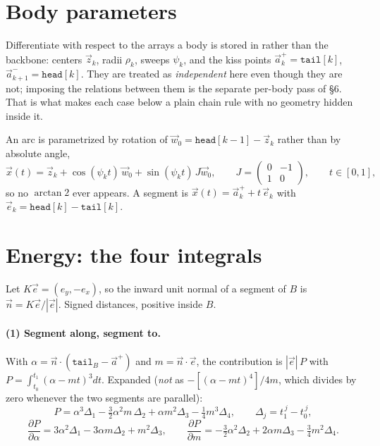 \documentclass[11pt]{article}
\newcommand{\vv}[1]{\vec{#1}}
\newcommand{\code}[1]{\texttt{#1}}
\begin{document}
\section{Body parameters}

Differentiate with respect to the arrays a body is stored in rather than the backbone: centers
$\vv z_k$, radii $\rho_k$, sweeps $\psi_k$, and the kiss points $\vv a^+_k=\code{tail}[k]$,
$\vv a^-_{k+1}=\code{head}[k]$. They are treated as \emph{independent} here even though they are not;
imposing the relations between them is the separate per-body pass of \S6. That is what makes each
case below a plain chain rule with no geometry hidden inside it.

An arc is parametrized by rotation of $\vv w_0=\code{head}[k-1]-\vv z_k$ rather than by absolute
angle,
\begin{equation}
  \vv x(t)=\vv z_k+\cos(\psi_k t)\,\vv w_0+\sin(\psi_k t)\,J\vv w_0,
  \qquad J=\begin{pmatrix}0&-1\\1&0\end{pmatrix},\qquad t\in[0,1],
\end{equation}
so no $\arctan\!2$ ever appears. A segment is $\vv x(t)=\vv a^+_k+t\,\vv e_k$ with
$\vv e_k=\code{head}[k]-\code{tail}[k]$.

\section{Energy: the four integrals}

Let $K\vv e=(e_y,-e_x)$, so the inward unit normal of a segment of $B$ is $\vv n=K\vv e/|\vv e|$.
Signed distances, positive inside $B$.

\paragraph{(1) Segment along, segment to.} With $\alpha=\vv n\cdot(\code{tail}_B-\vv a^+)$ and
$m=\vv n\cdot\vv e$, the contribution is $|\vv e|\,P$ with
$P=\int_{t_0}^{t_1}(\alpha-mt)^3dt$. Expanded (\emph{not} as
$-[(\alpha-mt)^4]/4m$, which divides by zero whenever the two segments are parallel):
\begin{equation}
  P=\alpha^3\Delta_1-\tfrac32\alpha^2m\,\Delta_2+\alpha m^2\Delta_3-\tfrac14 m^3\Delta_4,
  \qquad \Delta_j=t_1^{\,j}-t_0^{\,j},
\end{equation}
\begin{equation}
  \frac{\partial P}{\partial\alpha}=3\alpha^2\Delta_1-3\alpha m\Delta_2+m^2\Delta_3,
  \qquad
  \frac{\partial P}{\partial m}=-\tfrac32\alpha^2\Delta_2+2\alpha m\Delta_3-\tfrac34 m^2\Delta_4 .
\end{equation}
\end{document}
